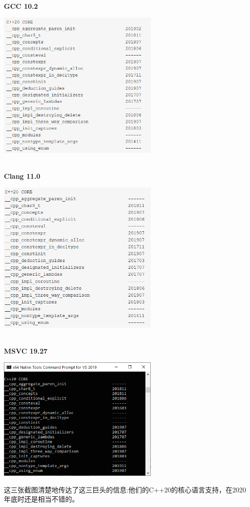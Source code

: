 \hspace*{\fill} \\ %
\noindent
\textbf{GCC 10.2}

\begin{center}
\includegraphics[width=0.6\textwidth]{content/5/chapter9/images/3.png}\\
\end{center}

\hspace*{\fill} \\ %
\noindent
\textbf{Clang 11.0}

\begin{center}
\includegraphics[width=0.6\textwidth]{content/5/chapter9/images/4.png}\\
\end{center}


\hspace*{\fill} \\ %
\noindent
\textbf{MSVC 19.27}

\begin{center}
\includegraphics[width=0.6\textwidth]{content/5/chapter9/images/5.png}\\
\end{center}

这三张截图清楚地传达了这三巨头的信息:他们的C++20的核心语言支持，在2020年底时还是相当不错的。


